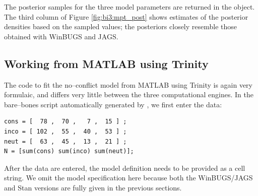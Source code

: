 \noindent The posterior samples for the three model parameters are returned in the  object. The third column of Figure \ref{fig:bi3:mpt_post} shows estimates of the posterior densities based on the sampled values; the posteriors closely resemble those obtained with WinBUGS and JAGS.



\subsection{Working from MATLAB using Trinity}
The code to fit the no--conflict model from MATLAB using Trinity is again very formulaic, and differs very little between the three computational engines. In the bare--bones script automatically generated by , we first enter the data:
\begin{lstlisting}
cons = [  78 ,  70 ,   7 ,  15 ] ;
inco = [ 102 ,  55 ,  40 ,  53 ] ;
neut = [  63 ,  45 ,  13 ,  21 ] ;
N = [sum(cons) sum(inco) sum(neut)];
\end{lstlisting}

After the data are entered, the model definition needs to be provided as a cell string. We omit the model specification here because both the {WinBUGS/JAGS} and Stan versions are fully given in the previous sections.

